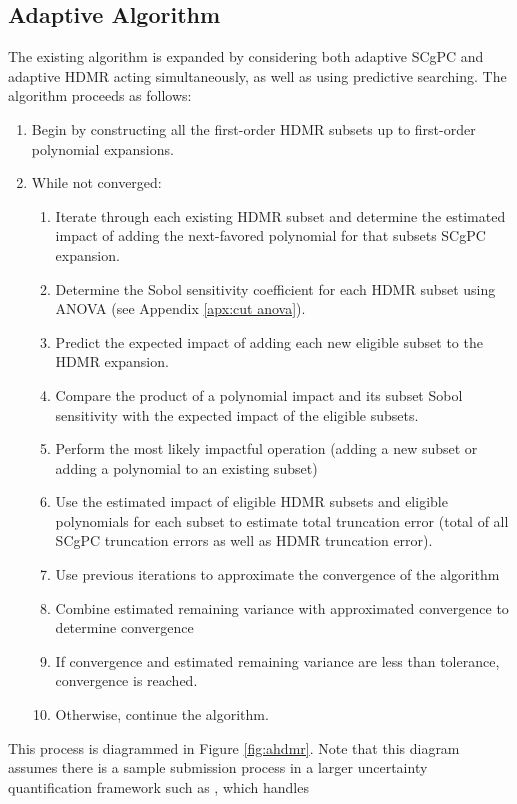 \subsection{Adaptive Algorithm}
The existing algorithm \cite{Gerstner,Ayres} is expanded by considering both adaptive SCgPC and adaptive HDMR
acting simultaneously, as well as using predictive searching.
The algorithm proceeds as follows:
\begin{enumerate}
  \item Begin by constructing all the first-order HDMR subsets up to first-order polynomial expansions.
  \item While not converged:
    \begin{enumerate}
      \item Iterate through each existing HDMR subset and determine the estimated impact of adding the
        next-favored polynomial for that subsets SCgPC expansion.
      \item Determine the Sobol sensitivity coefficient for each HDMR subset using ANOVA (see Appendix
        \ref{apx:cut anova}).
      \item Predict the expected impact of adding each new eligible subset to the HDMR expansion.
      \item Compare the product of a polynomial impact and its subset Sobol sensitivity with the expected impact
        of the eligible subsets.
      \item Perform the most likely impactful operation (adding a new subset or adding a polynomial to an
        existing subset)
      \item Use the estimated impact of eligible HDMR subsets and eligible polynomials for each subset to
        estimate total truncation error (total of all SCgPC truncation errors as well as HDMR truncation error).
      \item Use previous iterations to approximate the convergence of the algorithm
      \item Combine estimated remaining variance with approximated convergence to determine convergence
      \item If convergence and estimated remaining variance are less than tolerance, convergence is reached.
      \item Otherwise, continue the algorithm.
    \end{enumerate}
\end{enumerate}
This process is diagrammed in Figure \ref{fig:ahdmr}.  Note that this diagram assumes there is a sample
submission process in a larger uncertainty quantification framework such as \raven{} \cite{raven}, which handles
